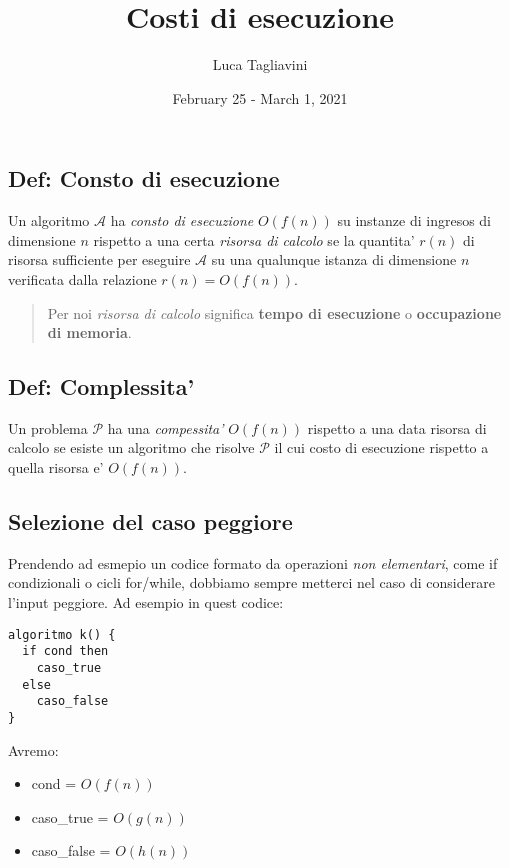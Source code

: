 \documentclass{article}
\title{\textbf{Costi di esecuzione}}
\author{Luca Tagliavini}
\date{February 25 - March 1, 2021}
\begin{document}
\maketitle
\tableofcontents
\pagebreak

\subsection{Def: Consto di esecuzione}

Un algoritmo $\mathcal{A}$ ha \emph{consto di esecuzione} $O(f(n))$ su instanze di ingresos
di dimensione $n$ rispetto a una certa \emph{risorsa di calcolo} se la quantita'
$r(n)$ di risorsa sufficiente per eseguire $\mathcal{A}$ su una qualunque istanza di
dimensione $n$ verificata dalla relazione $r(n) = O(f(n))$.

\begin{quote}
  Per noi \emph{risorsa di calcolo} significa \textbf{tempo di esecuzione} o \textbf{occupazione di memoria}.
\end{quote}

\subsection{Def: Complessita'}

Un problema $\mathcal{P}$ ha una \emph{compessita'} $O(f(n))$ rispetto a una data
risorsa di calcolo se esiste un algoritmo che risolve $\mathcal{P}$ il cui costo di
esecuzione rispetto a quella risorsa e' $O(f(n))$.

\subsection{Selezione del caso peggiore}

Prendendo ad esmepio un codice formato da operazioni \emph{non elementari}, come if
condizionali o cicli for/while, dobbiamo sempre metterci nel caso di considerare l'input
peggiore. Ad esempio in quest codice:

\begin{lstlisting}
algoritmo k() {
  if cond then
    caso_true
  else
    caso_false
}
\end{lstlisting}

Avremo:

\begin{itemize}
  \item cond = $O(f(n))$
  \item caso\_true = $O(g(n))$
  \item caso\_false = $O(h(n))$
\end{itemize}
\end{document}
